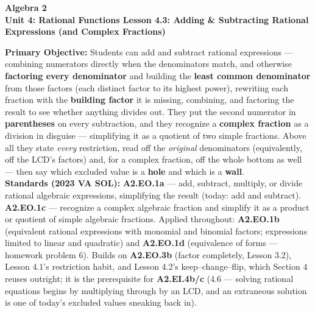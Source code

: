 \documentclass[10pt]{article}
\newcommand{\CourseName}{Algebra 2}
\newcommand{\UnitNumberName}{Unit 4: Rational Functions \quad}
\newcommand{\LessonNumberName}{Lesson 4.3: Adding \& Subtracting Rational Expressions (and Complex Fractions)}
\begin{document}
\begin{center}
    {\Large\bfseries \CourseName \\
    {\small\bfseries \UnitNumberName \LessonNumberName}}
\end{center}

\begin{tcolorbox}[colback=forestbg, colframe=forest, boxrule=0.9pt, arc=2mm,
    left=2mm, right=2mm, top=1.5mm, bottom=1.5mm]
    \textbf{Primary Objective:} Students can add and subtract rational expressions --- combining
    numerators directly when the denominators match, and otherwise \textbf{factoring every denominator}
    and building the \textbf{least common denominator} from those factors (each distinct factor to its
    highest power), rewriting each fraction with the \textbf{building factor} it is missing, combining,
    and factoring the result to see whether anything divides out. They put the second numerator in
    \textbf{parentheses} on every subtraction, and they recognize a \textbf{complex fraction} as a
    division in disguise --- simplifying it as a quotient of two simple fractions. Above all they state
    \emph{every} restriction, read off the \emph{original} denominators (equivalently, off the LCD's
    factors) and, for a complex fraction, off the whole bottom as well --- then say which excluded value
    is a \textbf{hole} and which is a \textbf{wall}.
    \\[2pt]
    \textbf{Standards (2023 VA SOL):} \textbf{A2.EO.1a} --- add, subtract, multiply, or divide rational
    algebraic expressions, simplifying the result (today: add and subtract). \textbf{A2.EO.1c} ---
    recognize a complex algebraic fraction and simplify it as a product or quotient of simple algebraic
    fractions. Applied throughout: \textbf{A2.EO.1b} (equivalent rational expressions with monomial and
    binomial factors; expressions limited to linear and quadratic) and \textbf{A2.EO.1d} (equivalence of
    forms --- homework problem 6). Builds on \textbf{A2.EO.3b} (factor completely, Lesson 3.2), Lesson
    4.1's restriction habit, and Lesson 4.2's keep--change--flip, which Section 4 reuses outright; it is
    the prerequisite for \textbf{A2.EI.4b/c} (4.6 --- solving rational equations begins by multiplying
    through by an LCD, and an extraneous solution is one of today's excluded values sneaking back in).
\end{tcolorbox}
\end{document}
